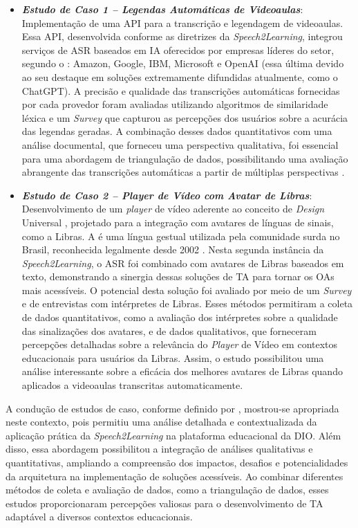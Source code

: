 \begin{itemize}
\item \textbf{\textit{Estudo de Caso 1 -- Legendas Automáticas de Videoaulas}}: Implementação de uma API para a transcrição e legendagem de videoaulas. Essa API, desenvolvida conforme as diretrizes da \textit{Speech2Learning}, integrou serviços de ASR baseados em IA oferecidos por empresas líderes do setor, segundo o : Amazon, Google, IBM, Microsoft e OpenAI (essa última devido ao seu destaque em soluções extremamente difundidas atualmente, como o ChatGPT). A precisão e qualidade das transcrições automáticas fornecidas por cada provedor foram avaliadas utilizando algoritmos de similaridade léxica e um \textit{Survey} que capturou as percepções dos usuários sobre a acurácia das legendas geradas. A combinação desses dados quantitativos com uma análise documental, que forneceu uma perspectiva qualitativa, foi essencial para uma abordagem de triangulação de dados, possibilitando uma avaliação abrangente das transcrições automáticas a partir de múltiplas perspectivas \cite{FalvoJr2023_HICSS, FalvoJr2024_FIE}.

\item \textbf{\textit{Estudo de Caso 2 -- Player de Vídeo com Avatar de Libras}}: Desenvolvimento de um \textit{player} de vídeo aderente ao conceito de \textit{Design} Universal \cite{GovBr2023}, projetado para a integração com avatares de línguas de sinais, como a Libras. A  é uma língua gestual utilizada pela comunidade surda no Brasil, reconhecida legalmente desde 2002 \cite{Quadros2017, Quadros2019, Honora2021}. Nesta segunda instância da \textit{Speech2Learning}, o ASR foi combinado com avatares de Libras baseados em texto, demonstrando a sinergia dessas soluções de TA para tornar os OAs mais acessíveis. O potencial desta solução foi avaliado por meio de um \textit{Survey} e de entrevistas com intérpretes de Libras. Esses métodos permitiram a coleta de dados quantitativos, como a avaliação dos intérpretes sobre a qualidade das sinalizações dos avatares, e de dados qualitativos, que forneceram percepções detalhadas sobre a relevância do \textit{Player} de Vídeo em contextos educacionais para usuários da Libras. Assim, o estudo possibilitou uma análise interessante sobre a eficácia dos melhores avatares de Libras quando aplicados a videoaulas transcritas automaticamente.
\end{itemize}

A condução de estudos de caso, conforme definido por , mostrou-se apropriada neste contexto, pois permitiu uma análise detalhada e contextualizada da aplicação prática da \textit{Speech2Learning} na plataforma educacional da DIO. Além disso, essa abordagem possibilitou a integração de análises qualitativas e quantitativas, ampliando a compreensão dos impactos, desafios e potencialidades da arquitetura na implementação de soluções acessíveis. Ao combinar diferentes métodos de coleta e avaliação de dados, como a triangulação de dados, esses estudos proporcionaram percepções valiosas para o desenvolvimento de TA adaptável a diversos contextos educacionais.

